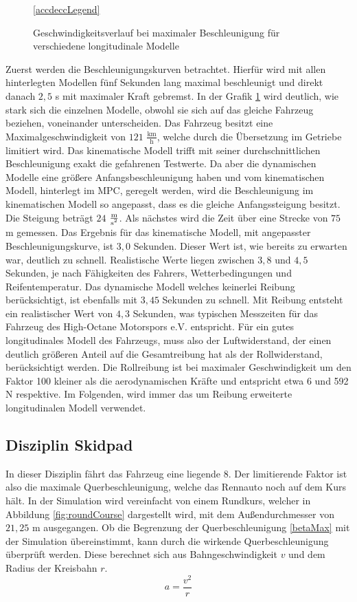 \documentclass{like}
\begin{document}
\begin{figure}
	\centering
	 
	\ref{accdeccLegend}
	\caption{Geschwindigkeitsverlauf bei maximaler Beschleunigung für verschiedene longitudinale Modelle}
	\label{fig:accdec}
\end{figure}
Zuerst werden die Beschleunigungskurven betrachtet. Hierfür wird mit allen hinterlegten Modellen fünf Sekunden lang maximal beschleunigt und direkt danach $2,5$ s mit maximaler Kraft gebremst.
In der Grafik \ref{fig:accdec} wird deutlich, wie stark sich die einzelnen Modelle, obwohl sie sich auf das gleiche Fahrzeug beziehen, voneinander unterscheiden. Das Fahrzeug besitzt eine Maximalgeschwindigkeit von $121$  $\frac{\text{km}}{\text{h}}$, welche durch die Übersetzung im Getriebe limitiert wird. Das kinematische Modell trifft mit seiner durchschnittlichen Beschleunigung exakt die gefahrenen Testwerte. Da aber die dynamischen Modelle eine größere Anfangsbeschleunigung haben und vom kinematischen Modell, hinterlegt im \ac{MPC}, geregelt werden, wird die Beschleunigung im kinematischen Modell so angepasst, dass es die gleiche Anfangssteigung besitzt. Die Steigung beträgt $24$ $ \frac{\text{m}}{\text{s\textsuperscript{2}}}$. 
Als nächstes wird die Zeit über eine Strecke von $75$ m gemessen. Das Ergebnis für das kinematische Modell, mit angepasster Beschleunigungskurve, ist $3,0$ Sekunden. Dieser Wert ist, wie bereits zu erwarten war, deutlich zu schnell. Realistische Werte liegen zwischen $3,8$ und $4,5$ Sekunden, je nach Fähigkeiten des Fahrers, Wetterbedingungen und Reifentemperatur. Das dynamische Modell welches keinerlei Reibung berücksichtigt, ist ebenfalls mit $3,45$ Sekunden zu schnell. Mit Reibung entsteht ein realistischer Wert von $4,3$ Sekunden, was typischen Messzeiten für das Fahrzeug des High-Octane Motorspors e.V. entspricht. Für ein gutes longitudinales Modell des Fahrzeugs, muss also der Luftwiderstand, der einen deutlich größeren Anteil auf die Gesamtreibung hat als der Rollwiderstand, berücksichtigt werden. Die Rollreibung ist bei maximaler Geschwindigkeit um den Faktor 100 kleiner als die aerodynamischen Kräfte und entspricht etwa 6 und 592 N respektive. Im Folgenden, wird immer das um Reibung erweiterte longitudinalen Modell verwendet.


\subsection{Disziplin Skidpad}
In dieser Disziplin fährt das Fahrzeug eine liegende 8. Der limitierende Faktor ist also die maximale Querbeschleunigung, welche das Rennauto noch auf dem Kurs hält. In der Simulation wird vereinfacht von einem Rundkurs, welcher in Abbildung \ref{fig:roundCourse} dargestellt wird, mit dem Außendurchmesser von $21,25$ m ausgegangen. Ob die Begrenzung der Querbeschleunigung \ref{betaMax} mit der Simulation übereinstimmt, kann durch die wirkende Querbeschleunigung überprüft werden.
Diese berechnet sich aus Bahngeschwindigkeit $v$ und dem Radius der Kreisbahn $r$. 
\begin{equation}
	a = \frac{v^2}{r}
\end{equation}
\end{document}
